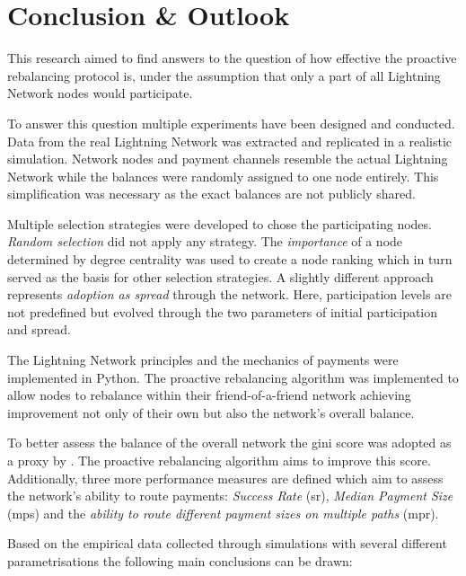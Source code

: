 \documentclass[final]{fhnwreport}       %
\begin{document}
\newpage
\section{Conclusion \& Outlook}\label{sec:concl}
This research aimed to find answers to the question of how effective the proactive rebalancing protocol is, under the assumption that only a part of all Lightning Network nodes would participate. 

To answer this question multiple experiments have been designed and conducted. Data from the real Lightning Network was extracted and replicated in a realistic simulation. Network nodes and payment channels resemble the actual Lightning Network while the balances were randomly assigned to one node entirely. This simplification was necessary as the exact balances are not publicly shared.

Multiple selection strategies were developed to chose the participating nodes. \emph{Random selection} did not apply any strategy. The \emph{importance} of a node determined by degree centrality was used to create a node ranking which in turn served as the basis for other selection strategies. A slightly different approach represents \emph{adoption as spread} through the network. Here, participation levels are not predefined but evolved through the two parameters of initial participation and spread.

The Lightning Network principles and the mechanics of payments were implemented in Python. The proactive rebalancing algorithm was implemented to allow nodes to rebalance within their friend-of-a-friend network achieving improvement not only of their own but also the network's overall balance. 

To better assess the balance of the overall network the \gls{gini} score was adopted as a \gls{proxy} by \textcite{pickhardt_imbalance_2019}. The proactive rebalancing algorithm aims to improve this score. Additionally, three more performance measures are defined which aim to assess the network's ability to route payments: \emph{Success Rate} (\gls{sr}), \emph{Median Payment Size} (\gls{mps}) and the \emph{ability to route different payment sizes on multiple paths} (\gls{mpr}). 

Based on the empirical data collected through simulations with several different parametrisations the following main conclusions can be drawn:
\end{document}
